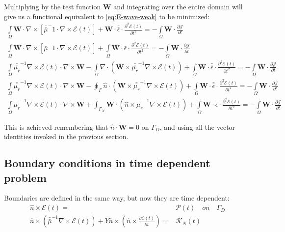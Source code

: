 Multiplying by the test function $\mathbf{W}$ and integrating over the entire domain will give us a functional equivalent to \ref{eq:E-wave-weak} to be minimized: 
\begin{align}
\int\limits_{\Omega}\mathbf{W}\cdot\nabla\times\left[\bar{\bar{\mu}}^-1\cdot\nabla \times\mathcal{E}(t)\right] + \mathbf{W}\cdot\bar{\bar{\epsilon}}\cdot\frac{\partial ^2\mathcal{E}(t)}{\partial t^2}=-\int\limits_{\Omega}\mathbf{W}\cdot\frac{\partial \mathcal{J}}{\partial t} \nonumber\\
\int\limits_{\Omega}\mathbf{W}\cdot\nabla\times\left[\bar{\bar{\mu}}^-1\cdot\nabla \times\mathcal{E}(t)\right] +\int\limits_{\Omega} \mathbf{W}\cdot\bar{\bar{\epsilon}}\cdot\frac{\partial ^2\mathcal{E}(t)}{\partial t^2}=-\int\limits_{\Omega}\mathbf{W}\cdot\frac{\partial \mathcal{J}}{\partial t} \nonumber\\
\int\limits_{\Omega} \bar{\bar{\mu_r}}^{-1}\nabla\times \mathcal{E}(t)\cdot \nabla\times\mathbf{W}-\int\limits_{\Omega}\nabla\cdot
\left(\mathbf{W}\times\bar{\bar{\mu_r}}^{-1}\nabla\times \mathcal{E}(t)
\right) +\int\limits_{\Omega} \mathbf{W}\cdot\bar{\bar{\epsilon}}\cdot\frac{\partial ^2\mathcal{E}(t)}{\partial t^2}=-\int\limits_{\Omega}\mathbf{W}\cdot\frac{\partial \mathcal{J}}{\partial t} \nonumber\\
\int\limits_{\Omega} \bar{\bar{\mu_r}}^{-1}\nabla\times \mathcal{E}(t)\cdot \nabla\times\mathbf{W}-\oint_{\Gamma}\hat{n}\cdot
\left(\mathbf{W}\times\bar{\bar{\mu_r}}^{-1}\nabla \times\mathcal{E}(t)\right)  +\int\limits_{\Omega} \mathbf{W}\cdot\bar{\bar{\epsilon}}\cdot\frac{\partial ^2\mathcal{E}(t)}{\partial t^2}=-\int\limits_{\Omega}\mathbf{W}\cdot\frac{\partial \mathcal{J}}{\partial t} \nonumber\\
\int\limits_{\Omega} \bar{\bar{\mu_r}}^{-1}\nabla\times \mathcal{E}(t)\cdot \nabla\times\mathbf{W}
+\int_{\Gamma_N}\mathbf{W}\cdot
\left(\hat{n}\times\bar{\bar{\mu_r}}^{-1}\nabla \times\mathcal{E}(t)\right)
+\int\limits_{\Omega} \mathbf{W}\cdot\bar{\bar{\epsilon}}\cdot\frac{\partial ^2\mathcal{E}(t)}{\partial t^2}=-\int\limits_{\Omega}\mathbf{W}\cdot\frac{\partial \mathcal{J}}{\partial t} \label{eq:time_dependent_Electric}
\end{align}

This is achieved remembering that $\hat{n}\cdot\mathbf{W} =0$ on $\Gamma_D$, and using all the vector identities invoked in the previous section.

\subsection{Boundary conditions in time dependent problem}
Boundaries are defined in the same way, but now they are time dependent:
\begin{align}
\hat{n}\times\mathcal{E}(t)=&\mathcal{P}(t)\quad on \quad \Gamma_D\\
\hat{n}\times\left(\bar{\bar{\mu}}^{-1}\nabla\times\mathcal{E}(t)
\right)+Y\hat{n}\times\left(\hat{n}\times\frac{\partial\mathcal{E} (t)}{\partial t}\right)=& \mathcal{K}_N(t)
\end{align}

